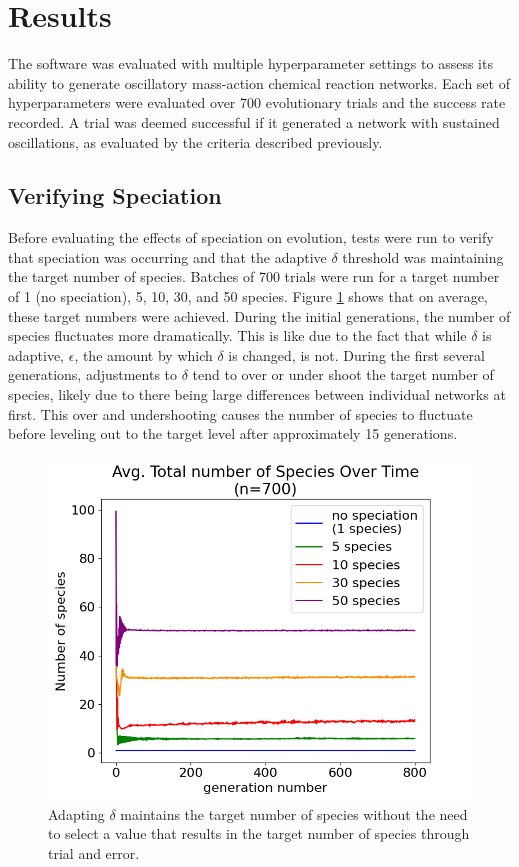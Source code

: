 \documentclass[12pt]{report}
\begin{document}
\section{Results}
The software was evaluated with multiple hyperparameter settings to assess its ability to generate oscillatory mass-action chemical reaction networks. Each set of hyperparameters were evaluated over 700 evolutionary trials and the success rate recorded. A trial was deemed successful if it generated a network with sustained oscillations, as evaluated by the criteria described previously.


\subsection{Verifying Speciation}
Before evaluating the effects of speciation on evolution, tests were run to verify that speciation was occurring and that the adaptive $\delta$ threshold was maintaining the target number of species. Batches of 700 trials were run for a target number of 1 (no speciation), 5, 10, 30, and 50 species. Figure \ref{fig:avg_num_species} shows that on average, these target numbers were achieved. During the initial generations, the number of species fluctuates more dramatically. This is like due to the fact that while $\delta$ is adaptive, $\epsilon$, the amount by which $\delta$ is changed, is not. During the first several generations, adjustments to $\delta$ tend to over or under shoot the target number of species, likely due to there being large differences between individual networks at first. This over and undershooting causes the number of species to fluctuate before leveling out to the target level after approximately 15 generations.

\begin{figure}
\centering
    \includegraphics[width=15cm]{images/avg_num_species.png}
    \caption[Average total number of species over time]{Adapting $\delta$ maintains the target number of species without the need to select a value that results in the target number of species through trial and error.}
    \label{fig:avg_num_species}
\end{figure}
\end{document}
